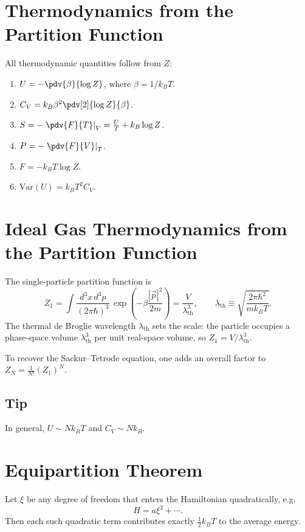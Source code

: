 \section{Thermodynamics from the Partition Function}

All thermodynamic quantities follow from $Z$:
\begin{enumerate}
    \item $U = -\pdv{\beta}{\log Z}$, where $\beta = 1/k_BT$.
    \item $C_V = k_B\beta^2\pdv[2]{\log Z}{\beta}$.
    \item $S = -\left.\pdv{F}{T}\right|_V = \frac{U}{T} + k_B\log Z$.
    \item $P = -\left.\pdv{F}{V}\right|_T$.
    \item $F = -k_BT\log Z$.
    \item $\text{Var}(U) = k_BT^2 C_V$.
\end{enumerate}

\section{Ideal Gas Thermodynamics from the Partition Function}

The single-particle partition function is
\begin{equation}
    Z_1 = \int \frac{d^3x\,d^3p}{(2\pi\hbar)^3}\,\exp\!\left(-\beta\frac{|\vec{p}|^2}{2m}\right) = \frac{V}{\lambda_{\text{th}}^3}, \qquad \lambda_{\text{th}} \equiv \sqrt{\frac{2\pi\hbar^2}{mk_BT}}.
\end{equation}
The thermal de Broglie wavelength $\lambda_{\text{th}}$ sets the scale: the particle occupies a phase-space volume $\lambda_{\text{th}}^3$ per unit real-space volume, so $Z_1 = V/\lambda_{\text{th}}^3$.

To recover the Sackur--Tetrode equation, one adds an overall factor to $Z_N = \frac{1}{N!}(Z_1)^N$.

\subsection{Tip}

In general, $U \sim Nk_BT$ and $C_V \sim Nk_B$.

\section{Equipartition Theorem}

\begin{theorem}
Let $\xi$ be any degree of freedom that enters the Hamiltonian quadratically, e.g.\
\begin{equation}
    H = a\xi^2 + \cdots.
\end{equation}
Then each such quadratic term contributes exactly $\tfrac{1}{2}k_BT$ to the average energy.
\end{theorem}

